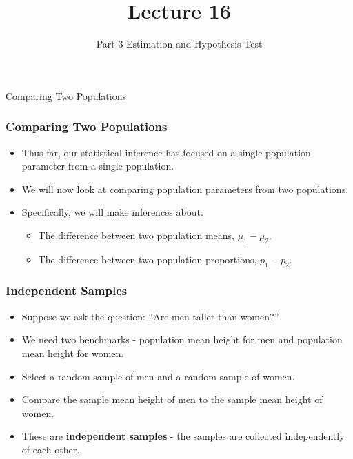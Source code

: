 \documentclass[12pt]{beamer}
\title[ECON2843]{Lecture 16}
\subtitle{Part 3 Estimation and Hypothesis Test}
\date{}
\begin{document}
	\begin{frame}
		\titlepage
	\end{frame}
	\begin{frame}
		\vspace{1cm}
		\centering
		{\color{blue}\large Comparing Two Populations}
	\end{frame}
	
\begin{frame}
	\frametitle{Comparing Two Populations}
	
	\begin{itemize}[label={\color{blue}$\blacktriangleright$}]
		\item Thus far, our statistical inference has focused on a single population parameter from a single population.
		\item We will now look at comparing population parameters from two populations.
		\item Specifically, we will make inferences about:
		\begin{itemize}[label={\color{blue}$\blacktriangleright$}]
			\item The difference between two population means, $\mu_1 - \mu_2$.
			\item The difference between two population proportions, $p_1 - p_2$.
		\end{itemize}
	\end{itemize}
	
\end{frame}
\begin{frame}
	\frametitle{Independent Samples}
	
	\begin{itemize}[label={\color{blue}$\blacktriangleright$}]
		\item Suppose we ask the question: ``Are men taller than women?''
		
		\item We need two benchmarks - population mean height for men and population mean height for women.
		
		\item Select a random sample of men and a random sample of women.
		
		\item Compare the sample mean height of men to the sample mean height of women.
		
		\item These are \textbf{independent samples} - the samples are collected independently of each other.
	\end{itemize}
	
\end{frame}
\end{document}

